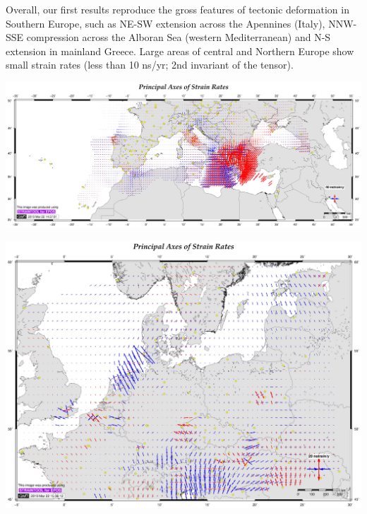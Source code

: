 \documentclass[landscape,a0paper,fontscale=0.324]{baposter} %
\begin{document}
\begin{poster}
{\begin{minipage}[b]{0.62\linewidth}
Overall, our first results reproduce the gross features of tectonic deformation in Southern Europe, such as NE-SW extension across the Apennines (Italy), NNW-SSE compression across the Alboran Sea (western Mediterranean) and N-S extension in mainland Greece. Large areas of central and Northern Europe show small strain rates (less than 10 ns/yr; 2nd invariant of the tensor).




     \includegraphics[width=\textwidth]{e14s050506-output_str-S.jpg}




\end{minipage}\hfill
\begin{minipage}[b]{0.36\linewidth}
     \includegraphics[width=.93\textwidth]{e14np050506e-output_str.jpg}
     

\end{minipage}}
\end{poster}
\end{document}
